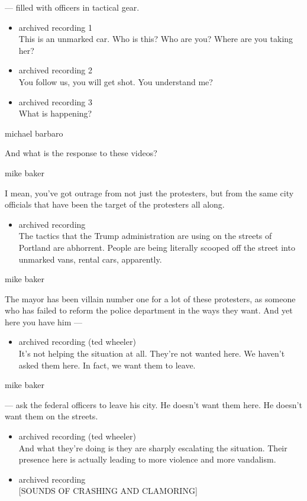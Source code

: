 --- filled with officers in tactical gear.

\begin{itemize}
\item
  archived recording 1\\
  This is an unmarked car. Who is this? Who are you? Where are you
  taking her?
\item
  archived recording 2\\
  You follow us, you will get shot. You understand me?
\item
  archived recording 3\\
  What is happening?
\end{itemize}

michael barbaro

And what is the response to these videos?

mike baker

I mean, you've got outrage from not just the protesters, but from the
same city officials that have been the target of the protesters all
along.

\begin{itemize}
\tightlist
\item
  archived recording\\
  The tactics that the Trump administration are using on the streets of
  Portland are abhorrent. People are being literally scooped off the
  street into unmarked vans, rental cars, apparently.
\end{itemize}

mike baker

The mayor has been villain number one for a lot of these protesters, as
someone who has failed to reform the police department in the ways they
want. And yet here you have him ---

\begin{itemize}
\tightlist
\item
  archived recording (ted wheeler)\\
  It's not helping the situation at all. They're not wanted here. We
  haven't asked them here. In fact, we want them to leave.
\end{itemize}

mike baker

--- ask the federal officers to leave his city. He doesn't want them
here. He doesn't want them on the streets.

\begin{itemize}
\item
  archived recording (ted wheeler)\\
  And what they're doing is they are sharply escalating the situation.
  Their presence here is actually leading to more violence and more
  vandalism.
\item
  archived recording\\
  {[}SOUNDS OF CRASHING AND CLAMORING{]}
\end{itemize}

